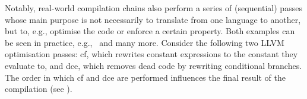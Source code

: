 \documentclass[dvipsnames,conference]{IEEEtran}
\theoremstyle{definition}
\begin{document}
Notably, real-world compilation chains also perform a series of (sequential) passes whose main purpose is not necessarily to translate from one language to another, but to, e.g., optimise the code or enforce a certain property.
Both examples can be seen in practice, e.g.,~\cite{nagarakatte2009soft,nagarakatte2010cets,akritidis2009baggy,wegman1991ccp,manjikian1997fusion} and many more.
% 
Consider the following two LLVM optimisation passes: \gls*{cf}, which rewrites constant expressions to the constant they evaluate to, and \gls*{dce}, which removes dead code by rewriting conditional branches.
The order in which \gls*{cf} and \gls*{dce} are performed influences the final result of the compilation (see ).
\end{document}
